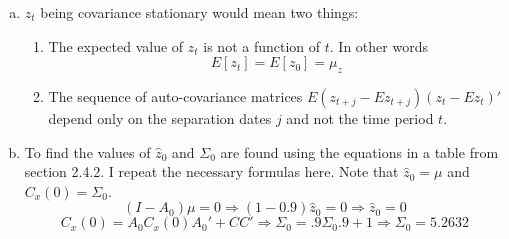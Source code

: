 \documentclass{homework}
\begin{document}
\begin{homeworkProblem}[Problem 2.24]
{\begin{enumerate}[a.]
        Therefore, I can say that $E[y_t] = E[z_t]$ and I have already explained how $z_t$ is Markov.

      \item $z_t$ being covariance stationary would mean two things:
        \begin{enumerate}[1.]
          \item The expected value of $z_t$ is not a function of $t$. In other words $$E[z_t] = E[z_0] = \mu_z $$
          \item The sequence of auto-covariance matrices $E \left( z_{t+j} - E z_{t+j} \right) \left( z_t - E z_t \right) '$ depend only on the separation dates $j$ and not the time period $t$.
        \end{enumerate}

      \item To find the values of $\hat{z}_0$ and $\Sigma_0$ are found using the equations in a table from section 2.4.2. I repeat the necessary formulas here. Note that $\hat{z}_0 = \mu$ and $C_x(0) = \Sigma_0$.
        $$(I - A_0) \mu = 0 \Longrightarrow (1 - 0.9) \hat{z}_0 = 0 \Longrightarrow \hat{z}_0 = 0$$
        $$C_x(0) = A_0C_x(0)A_0' + CC' \Longrightarrow \Sigma_0 = .9 \Sigma_0 .9 + 1 \Longrightarrow \Sigma_0 = 5.2632$$


\end{enumerate}}
\end{homeworkProblem}
\end{document}

